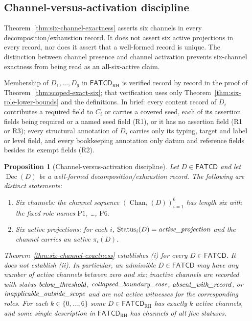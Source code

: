 \documentclass[11pt]{article}
\newtheorem{proposition}[theorem]{Proposition}
\theoremstyle{definition}
\newcommand{\FATCD}{\ensuremath{\mathsf{FATCD}}}
\newcommand{\Dec}[1]{\ensuremath{\operatorname{Dec}\!\left(#1\right)}}
\newcommand{\Chan}[2]{\ensuremath{\operatorname{Chan}_{#1}\!\left(#2\right)}}
\newcommand{\Status}[2]{\ensuremath{\operatorname{Status}_{#1}\!\left(#2\right)}}
\newcommand{\activeproj}{\textit{active\_\allowbreak projection}}
\newcommand{\belowthr}{\textit{below\_\allowbreak threshold}}
\newcommand{\collapsedbc}{\textit{collapsed\_\allowbreak boundary\_\allowbreak case}}
\newcommand{\absentrec}{\textit{absent\_\allowbreak with\_\allowbreak record}}
\newcommand{\outsidescope}{\textit{inapplicable\_\allowbreak outside\_\allowbreak scope}}
\newcommand{\Pone}{\ensuremath{\mathrm{P1}}}
\newcommand{\Psix}{\ensuremath{\mathrm{P6}}}
\begin{document}
\subsection{Channel-versus-activation discipline}\label{subsec:channel-vs-activation}

Theorem~\ref{thm:six-channel-exactness} asserts six channels in every
decomposition/exhaustion record. It does not assert six active
projections in every record, nor does it assert that a well-formed
record is unique. The distinction between channel presence and
channel activation prevents six-channel exactness from being read as
an all-six-active claim.

Membership of \(D_1,\dots,D_6\) in \(\FATCD_{\mathrm{RH}}\) is verified record by
record in the proof of Theorem~\ref{thm:scoped-exact-six}; that verification
uses only Theorem~\ref{thm:six-role-lower-bounds} and the definitions. In brief:
every content record of \(D_i\) contributes a required field to \(C_i\) or
carries a covered seed, each of its assertion fields being required or a named
seed field (R1), or it has no assertion field (R1 or R3); every structural
annotation of \(D_i\) carries only its typing, target and label or level field,
and every bookkeeping annotation only datum and reference fields besides its
exempt fields (R2).

\begin{proposition}[Channel-versus-activation discipline]\label{prop:channel-vs-activation}
Let \(D \in \FATCD{}\) and let \(\Dec{D}\) be a well-formed decomposition/exhaustion
record. The following are distinct statements:
\begin{enumerate}[label=(\roman*),topsep=2pt,itemsep=1pt]
  \item \emph{Six channels}: the channel sequence
    \((\Chan{i}{D})_{i=1}^{6}\) has length six with the fixed role names
    \Pone{}, \ldots, \Psix{}.
  \item \emph{Six active projections}: for each \(i\),
    \(\Status{i}{D} = \activeproj\) and the channel carries an active
    \(\pi_i(D)\).
\end{enumerate}
Theorem~\ref{thm:six-channel-exactness} establishes (i) for every
\(D \in \FATCD{}\). It does not establish (ii). In particular, an
admissible \(D \in \FATCD{}\) may have any number of active channels
between zero and six; inactive channels are recorded with status
\(\belowthr\), \(\collapsedbc\), \(\absentrec\), or \(\outsidescope\)
and are not active witnesses for the corresponding roles. For each
\(k\in\{0,\dots,6\}\) some \(D\in\FATCD_{\mathrm{RH}}\) has exactly \(k\) active
channels, and some single description in \(\FATCD_{\mathrm{RH}}\) has channels of all
five statuses.
\end{proposition}
\end{document}
